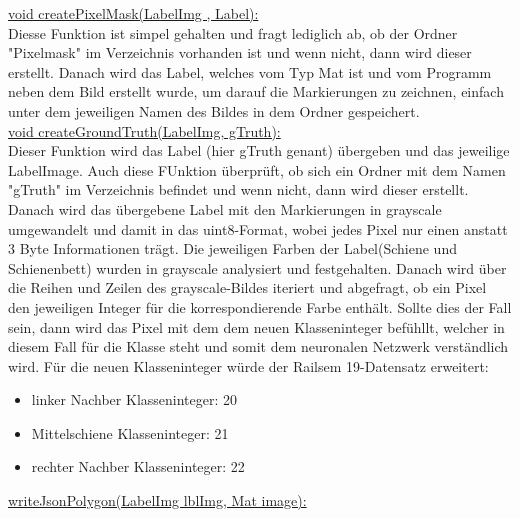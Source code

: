 \documentclass[11pt]{scrartcl}
\begin{document}
\noindent
\underline{ void createPixelMask(LabelImg , Label):}
\\
Diesse Funktion ist simpel gehalten und fragt lediglich ab, ob der Ordner "Pixelmask" im Verzeichnis vorhanden ist und wenn nicht, dann wird dieser erstellt. Danach wird das Label, welches vom Typ Mat ist und vom Programm neben dem Bild erstellt wurde, um darauf die Markierungen zu zeichnen, einfach unter dem jeweiligen Namen des Bildes in dem Ordner gespeichert. 
\\

\noindent
\underline{void createGroundTruth(LabelImg, gTruth):}
\\
Dieser Funktion wird  das Label (hier gTruth genant) übergeben und das jeweilige LabelImage. Auch diese FUnktion überprüft, ob sich ein Ordner mit dem Namen "gTruth" im Verzeichnis befindet und wenn nicht, dann wird dieser erstellt. Danach wird das übergebene Label mit den Markierungen in grayscale umgewandelt und damit in das uint8-Format, wobei jedes Pixel nur einen anstatt 3 Byte Informationen trägt. Die jeweiligen Farben der Label(Schiene und Schienenbett) wurden in grayscale analysiert und festgehalten. Danach wird über die Reihen und Zeilen des grayscale-Bildes iteriert und abgefragt, ob ein Pixel den jeweiligen Integer für die korrespondierende Farbe enthält. Sollte dies der Fall sein, dann wird das Pixel mit dem dem neuen Klasseninteger befühllt, welcher in diesem Fall für die Klasse steht und somit dem neuronalen Netzwerk verständlich wird. Für die neuen Klasseninteger würde der Railsem 19-Datensatz erweitert:
\begin{itemize}
	\item linker Nachber Klasseninteger: 20
	\item Mittelschiene Klasseninteger: 21
	\item rechter Nachber Klasseninteger: 22
\end{itemize}

\noindent
\underline{writeJsonPolygon(LabelImg lblImg, Mat image):}
\\
\end{document}

